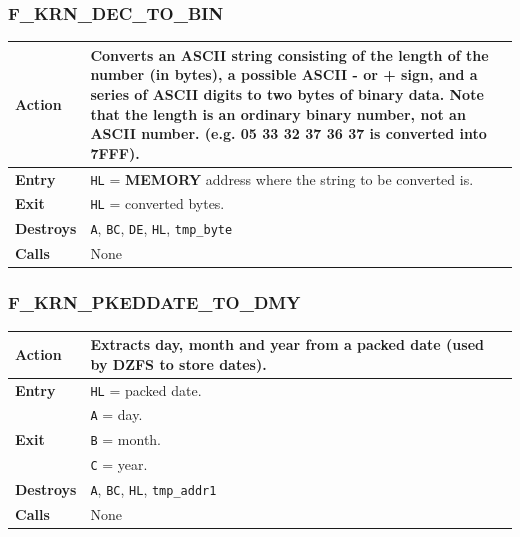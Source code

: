 \documentclass[a4paper,11pt]{article}
\begin{document}
        \subsubsection{F\_KRN\_DEC\_TO\_BIN}
        \label{func:fkrndectobin}
        \begin{tabular}{l p{9cm}}
            \hline\textbf{Action}
            & Converts an ASCII string consisting of the length of the number
            (in bytes), a possible ASCII - or + sign, and a series of ASCII
            digits to two bytes of binary data. Note that the length is an
            ordinary binary number, not an ASCII number. (e.g. 05 33 32 37 36 37
            is converted into 7FFF).\\
            \hline\textbf{Entry} & \texttt{HL} = \textbf{MEMORY} address where
            the string to be converted is.\\
            \hline\textbf{Exit} & \texttt{HL} = converted bytes.\\
            \hline\textbf{Destroys} & \texttt{A}, \texttt{BC}, \texttt{DE}, 
            \texttt{HL}, \texttt{tmp\_byte}\\
            \hline\textbf{Calls} & None\\
            \hline
        \end{tabular}

        \subsubsection{F\_KRN\_PKEDDATE\_TO\_DMY}
        \label{func:fkrnpkeddatetodmy}
        \begin{tabular}{l p{9cm}}
            \hline\textbf{Action}
            & Extracts day, month and year from a packed date (used by DZFS to
            store dates).\\
            \hline\textbf{Entry} & \texttt{HL} = packed date.\\
            \hline\multirow[t]{3}{4em}{\textbf{Exit}}
            & \texttt{A} = day.\\
            & \texttt{B} = month.\\
            & \texttt{C} = year.\\
            \hline\textbf{Destroys} & \texttt{A}, \texttt{BC}, \texttt{HL},
            \texttt{tmp\_addr1}\\
            \hline\textbf{Calls} & None\\
            \hline
        \end{tabular}
\end{document}
